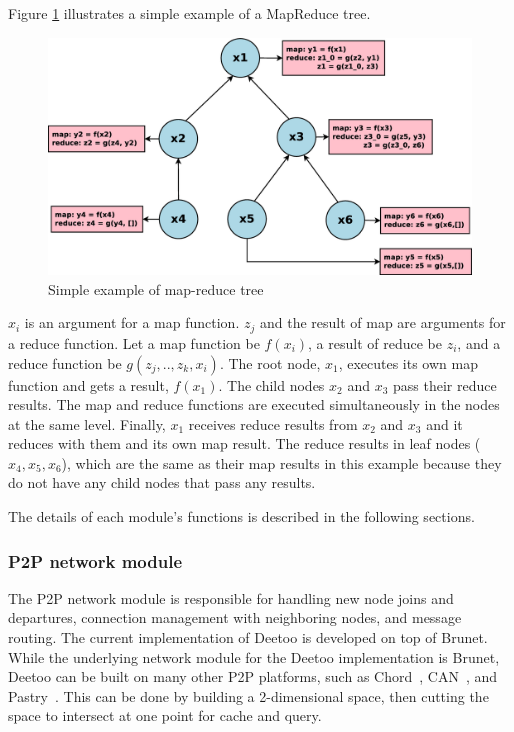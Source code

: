 \documentclass[9.5pt,journal,final,finalsubmission,twocolumn]{IEEEtran}
\begin{document}
Figure \ref{fig:mapreduce_tree} illustrates a simple example of a MapReduce
tree. 
\begin{figure}
\centering
\includegraphics[width=5.3in]{mapreduce_tree.eps}
\caption{Simple example of map-reduce tree}\label{fig:mapreduce_tree}
\end{figure}
$x_i$ is an argument for a map function. $z_j$ and the result of map are 
arguments for a reduce function.
Let a map function be $f(x_i)$, a result of 
reduce be $z_i$, and a reduce function be $g(z_j,..,z_k,x_i)$.
The root node, $x_1$, executes its own map function and gets 
a result, $f(x_1)$. The child nodes $x_2$ and $x_3$ pass their
reduce results. The map and reduce functions are executed simultaneously
in the nodes at the same level.
Finally, $x_1$ receives reduce results from $x_2$ and $x_3$ and 
it reduces with them and its own map result.
The reduce results in leaf nodes ($x_4, x_5, x_6$), which are the same as 
their map results in this example because they do not have 
any child nodes that pass any results. 

The details of each module's functions is described in the following sections.

         
\subsubsection{P2P network module}
The P2P network module is responsible for handling new node joins 
and departures, 
connection management with neighboring nodes, and message routing. 
The current implementation of Deetoo is developed on top of Brunet.
While the underlying network module for the Deetoo implementation 
is Brunet, Deetoo can be built on many other P2P platforms, 
such as Chord~\cite{is:Chord}, CAN~\cite{CAN}, and Pastry~\cite{pastry}.
This can be done by building a 2-dimensional space, then cutting the space
to intersect at one point for cache and query.
\end{document}
